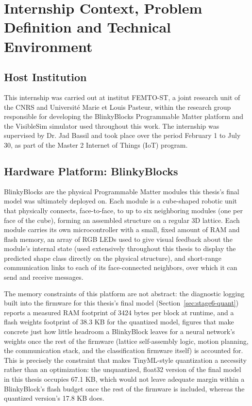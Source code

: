 \documentclass[12pt,a4paper]{report}
\begin{document}
\chapter{Internship Context, Problem Definition and Technical Environment}
\label{ch:context}

\section{Host Institution}

This internship was carried out at institut FEMTO-ST, a joint research unit of the CNRS and Université Marie et Louis Pasteur, within the research group responsible for developing the BlinkyBlocks Programmable Matter platform and the VisibleSim simulator used throughout this work. The internship was supervised by Dr. Jad Bassil and took place over the period February 1 to July 30, as part of the Master 2 Internet of Things (IoT) program.

\section{Hardware Platform: BlinkyBlocks}

BlinkyBlocks are the physical Programmable Matter modules this thesis's final model was ultimately deployed on. Each module is a cube-shaped robotic unit that physically connects, face-to-face, to up to six neighboring modules (one per face of the cube), forming an assembled structure on a regular 3D lattice. Each module carries its own microcontroller with a small, fixed amount of RAM and flash memory, an array of RGB LEDs used to give visual feedback about the module's internal state (used extensively throughout this thesis to display the predicted shape class directly on the physical structure), and short-range communication links to each of its face-connected neighbors, over which it can send and receive messages.

The memory constraints of this platform are not abstract: the diagnostic logging built into the firmware for this thesis's final model (Section~\ref{sec:stage6-quant}) reports a measured RAM footprint of 3424 bytes per block at runtime, and a flash weights footprint of 38.3 KB for the quantized model, figures that make concrete just how little headroom a BlinkyBlock leaves for a neural network's weights once the rest of the firmware (lattice self-assembly logic, motion planning, the communication stack, and the classification firmware itself) is accounted for. This is precisely the constraint that makes TinyML-style quantization a necessity rather than an optimization: the unquantized, float32 version of the final model in this thesis occupies 67.1 KB, which would not leave adequate margin within a BlinkyBlock's flash budget once the rest of the firmware is included, whereas the quantized version's 17.8 KB does.
\end{document}
